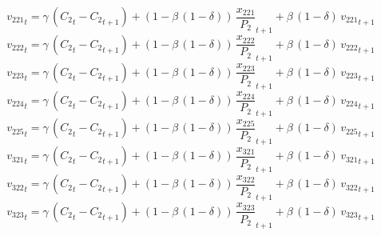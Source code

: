 \begin{dmath}
{{v_{221}}}_{t}={{\gamma}}\, \left({{C_{2}}}_{t}-{{C_{2}}}_{t+1}\right)+\left(1-{{\beta}}\, \left(1-{{\delta}}\right)\right)\, {{\frac{x_{221}}{P_{2}}}}_{t+1}+{{\beta}}\, \left(1-{{\delta}}\right)\, {{v_{221}}}_{t+1}
\end{dmath}
\begin{dmath}
{{v_{222}}}_{t}={{\gamma}}\, \left({{C_{2}}}_{t}-{{C_{2}}}_{t+1}\right)+\left(1-{{\beta}}\, \left(1-{{\delta}}\right)\right)\, {{\frac{x_{222}}{P_{2}}}}_{t+1}+{{\beta}}\, \left(1-{{\delta}}\right)\, {{v_{222}}}_{t+1}
\end{dmath}
\begin{dmath}
{{v_{223}}}_{t}={{\gamma}}\, \left({{C_{2}}}_{t}-{{C_{2}}}_{t+1}\right)+\left(1-{{\beta}}\, \left(1-{{\delta}}\right)\right)\, {{\frac{x_{223}}{P_{2}}}}_{t+1}+{{\beta}}\, \left(1-{{\delta}}\right)\, {{v_{223}}}_{t+1}
\end{dmath}
\begin{dmath}
{{v_{224}}}_{t}={{\gamma}}\, \left({{C_{2}}}_{t}-{{C_{2}}}_{t+1}\right)+\left(1-{{\beta}}\, \left(1-{{\delta}}\right)\right)\, {{\frac{x_{224}}{P_{2}}}}_{t+1}+{{\beta}}\, \left(1-{{\delta}}\right)\, {{v_{224}}}_{t+1}
\end{dmath}
\begin{dmath}
{{v_{225}}}_{t}={{\gamma}}\, \left({{C_{2}}}_{t}-{{C_{2}}}_{t+1}\right)+\left(1-{{\beta}}\, \left(1-{{\delta}}\right)\right)\, {{\frac{x_{225}}{P_{2}}}}_{t+1}+{{\beta}}\, \left(1-{{\delta}}\right)\, {{v_{225}}}_{t+1}
\end{dmath}
\begin{dmath}
{{v_{321}}}_{t}={{\gamma}}\, \left({{C_{2}}}_{t}-{{C_{2}}}_{t+1}\right)+\left(1-{{\beta}}\, \left(1-{{\delta}}\right)\right)\, {{\frac{x_{321}}{P_{2}}}}_{t+1}+{{\beta}}\, \left(1-{{\delta}}\right)\, {{v_{321}}}_{t+1}
\end{dmath}
\begin{dmath}
{{v_{322}}}_{t}={{\gamma}}\, \left({{C_{2}}}_{t}-{{C_{2}}}_{t+1}\right)+\left(1-{{\beta}}\, \left(1-{{\delta}}\right)\right)\, {{\frac{x_{322}}{P_{2}}}}_{t+1}+{{\beta}}\, \left(1-{{\delta}}\right)\, {{v_{322}}}_{t+1}
\end{dmath}
\begin{dmath}
{{v_{323}}}_{t}={{\gamma}}\, \left({{C_{2}}}_{t}-{{C_{2}}}_{t+1}\right)+\left(1-{{\beta}}\, \left(1-{{\delta}}\right)\right)\, {{\frac{x_{323}}{P_{2}}}}_{t+1}+{{\beta}}\, \left(1-{{\delta}}\right)\, {{v_{323}}}_{t+1}
\end{dmath}
